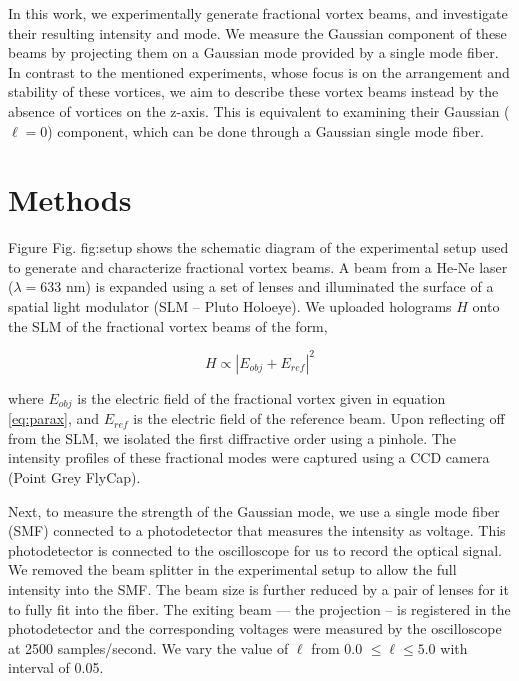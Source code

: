 \documentclass[10pt,a4paper,twoside]{article}
\renewcommand{\l}{\ell}
\renewcommand{\ref}[1]{Fig. #1}
\begin{document}
In this work, we experimentally generate fractional vortex beams, and investigate their resulting intensity and mode. We measure the Gaussian component of these beams by projecting them on a Gaussian mode provided by a single mode fiber. In contrast to the mentioned experiments, whose focus is on the arrangement and stability of these vortices, we aim to describe these vortex beams instead by the absence of vortices on the z-axis. This is equivalent to examining their Gaussian ($\ell=0$) component, which can be done through a Gaussian single mode fiber.


\section{Methods}\label{sec:methods}
Figure \ref{fig:setup} shows the schematic diagram of the experimental setup used to generate and characterize fractional vortex beams. A beam from a He-Ne laser ($\lambda= 633$ nm) is expanded using a set of lenses and illuminated the surface of a spatial light modulator (SLM -- Pluto Holoeye). We uploaded holograms $H$ onto the SLM of the fractional vortex beams of the form,

\begin{equation}
    H \propto {|E_{obj} + E_{ref}|}^2 
\end{equation}

\noindent where $E_{obj}$ is the electric field of the fractional vortex given in equation \eqref{eq:parax}, and $E_{ref}$ is the electric field of the reference beam. Upon reflecting off from the SLM, we isolated the first diffractive order using a pinhole. The intensity profiles of these fractional modes were captured using a CCD camera (Point Grey FlyCap). 

Next, to measure the strength of the Gaussian mode, we use a single mode fiber (SMF) connected to a photodetector that measures the intensity as voltage. This photodetector is connected to the oscilloscope for us to record the optical signal. We removed the beam splitter in the experimental setup to allow the full intensity into the SMF. The beam size is further reduced by a pair of lenses for it to fully fit into the fiber. The exiting beam --- the projection -- is registered in the photodetector and the corresponding voltages were measured by the oscilloscope at 2500 samples/second. We vary the value of $\l$ from 0.0 $\le \l \le 5.0$ with interval of 0.05. 
\end{document}
